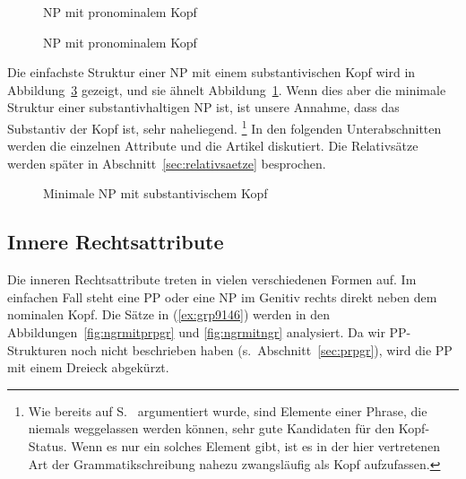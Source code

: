 \begin{figure}[!htbp]
  \centering
  \caption{NP mit pronominalem Kopf}
  \label{fig:pronngr1}
\end{figure}

\begin{figure}[!htbp]
  \centering
  \caption{NP mit pronominalem Kopf}
  \label{fig:pronngr2}
\end{figure}

Die einfachste Struktur einer NP mit einem substantivischen Kopf wird in Abbildung~\ref{fig:ngreinf} gezeigt, und sie ähnelt Abbildung~\ref{fig:pronngr1}.
Wenn dies aber die minimale Struktur einer substantivhaltigen NP ist, ist unsere Annahme, dass das Substantiv der Kopf ist, sehr naheliegend.%
\footnote{Wie bereits auf S.~\pageref{abs:kopfnichtweglassbar} argumentiert wurde, sind Elemente einer Phrase, die niemals weggelassen werden können, sehr gute Kandidaten für den Kopf-Status.
Wenn es nur ein solches Element gibt, ist es in der hier vertretenen Art der Grammatikschreibung nahezu zwangsläufig als Kopf aufzufassen.}
In den folgenden Unterabschnitten werden die einzelnen Attribute und die Artikel diskutiert.
Die Relativsätze werden später in Abschnitt~\ref{sec:relativsaetze} besprochen.

\begin{figure}[!htbp]
  \centering
  \caption{Minimale NP mit substantivischem Kopf}
  \label{fig:ngreinf}
\end{figure}

\subsection{Innere Rechtsattribute}

\label{sec:innererechtsattribute}

Die inneren Rechtsattribute treten in vielen verschiedenen Formen auf.
Im einfachen Fall steht eine PP oder eine NP im Genitiv rechts direkt neben dem nominalen Kopf.
Die Sätze in (\ref{ex:grp9146}) werden in den Abbildungen~\ref{fig:ngrmitprpgr} und \ref{fig:ngrmitngr} analysiert.
Da wir PP-Strukturen noch nicht beschrieben haben (s.\ Abschnitt~\ref{sec:prpgr}), wird die PP mit einem Dreieck abgekürzt.

